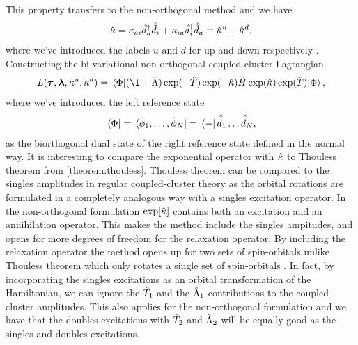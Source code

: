             This property transfers to the non-orthogonal method and we have
            \begin{align}
                \hat{\kappa}
                = \kappa_{ai} \hat{d}^{\dagger}_{a}\hat{\tilde{d}}_{i}
                + \kappa_{ia} \hat{d}^{\dagger}_{i}\hat{\tilde{d}}_{a}
                \equiv
                \hat{\kappa}^{u} + \hat{\kappa}^{d},
            \end{align}
            where we've introduced the labels $u$ and $d$ for up and down
            respectively \cite{rolf-nocc}.
            Constructing the bi-variational non-orthogonal coupled-cluster
            Lagrangian
            \begin{align}
                L(\vfg{\clustamp}, \vfg{\clustlamp}, \noccten^{u},
                \noccten^{d})
                = \mel*{\tilde{\slat}}{
                    (\1 + \clustl)
                    \exponential(-\clust)
                    \exponential(-\nocc)
                    \hamil
                    \exponential(\nocc)
                    \exponential(\clust)
                }{\slat},
                \label{eq:nocc-lagrangian}
            \end{align}
            where we've introduced the left reference state
            \begin{align}
                \bra*{\tilde{\Phi}}
                = \bra*{\tilde{\phi}_1, \dots, \tilde{\phi}_N}
                = \bra*{-}\hat{\tilde{d}}_{1}\dots\hat{\tilde{d}}_{N},
            \end{align}
            as the biorthogonal dual state of the right reference state defined
            in the normal way.
            It is interesting to compare the exponential operator with $\hat{\kappa}$
            to Thouless theorem from \autoref{theorem:thouless}.
            Thouless theorem can be compared to the singles amplitudes in
            regular coupled-cluster theory as the orbital rotations are
            formulated in a completely analogous way with a singles excitation
            operator.
            In the non-orthogonal formulation $\exp[\hat{\kappa}]$ contains both an
            excitation and an annihilation operator.
            This makes the method include the singles ampitudes, and opens for
            more degrees of freedom for the relaxation operator.
            By including the relaxation operator the method opens up for two
            sets of spin-orbitals unlike Thouless theorem which only rotates a
            single set of spin-orbitals \cite{helgaker-molecular}.
            In fact, by incorporating the singles excitations as an orbital
            transformation of the Hamiltonian, we can ignore the $\hat{T}_1$ and
            the $\hat{\Lambda}_1$ contributions to the coupled-cluster amplitudes.
            This also applies for the non-orthogonal formulation and we have
            that the doubles excitations with $\hat{T}_2$ and $\hat{\Lambda}_2$ will be
            equally good as the singles-and-doubles excitations.

